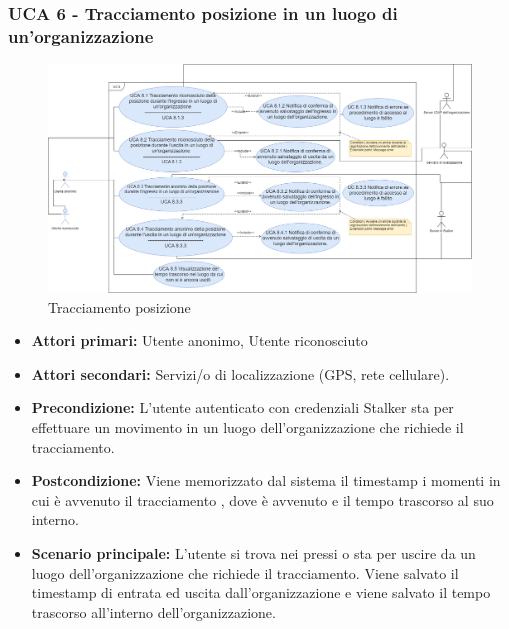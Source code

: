 \subsubsection{UCA 6 - Tracciamento posizione in un luogo di un'organizzazione}%

\begin{figure}[h]
	\centering
	\includegraphics[scale=0.3]{sezioni/UseCase/Immagini/UCA6.png}
	\caption{Tracciamento posizione}
\end{figure}

\begin{itemize}
	\item \textbf{Attori primari:} Utente anonimo, Utente riconosciuto
	\item \textbf{Attori secondari:} Servizi/o di localizzazione (GPS, rete cellulare).
	\item \textbf{Precondizione:} L'utente autenticato con credenziali Stalker sta per effettuare un movimento in un luogo dell'organizzazione che richiede il tracciamento.
	\item \textbf{Postcondizione:} Viene memorizzato dal sistema il timestamp i momenti in cui è avvenuto il tracciamento , dove è avvenuto e il tempo trascorso al suo interno.
	\item \textbf{Scenario principale:} L'utente si trova nei pressi o sta per uscire da un luogo dell'organizzazione che richiede il tracciamento. Viene salvato il timestamp di entrata ed uscita dall'organizzazione e viene salvato il tempo trascorso all'interno dell'organizzazione.
\end{itemize}

